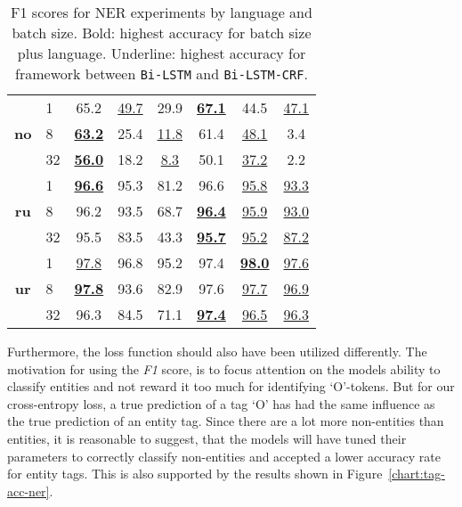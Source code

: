 \begin{table}[h!]
\begin{tabular}{c l c c c|c c c}
        \cmidrule(lr){1-8}
        \multirow{3}{*}{\bfseries no}
        &  1 &
        65.2 & \underline{49.7} & 29.9 &
        \underline{\textbf{67.1}} & 44.5 & \underline{47.1} \\
        &  8 &
        \underline{\textbf{63.2}} & 25.4 & \underline{11.8} &
        61.4 & \underline{48.1} &  3.4 \\
        & 32 &
        \underline{\textbf{56.0}} & 18.2 &  \underline{8.3 }&
        50.1 & \underline{37.2} &  2.2 \\

        \cmidrule(lr){1-8}
        \multirow{3}{*}{\bfseries ru}
        &  1 &
        \underline{\textbf{96.6}} & 95.3 & 81.2 &
        96.6 & \underline{95.8} & \underline{93.3} \\
        &  8 &
        96.2 & 93.5 & 68.7 &
        \underline{\textbf{96.4}} & \underline{95.9} & \underline{93.0} \\
        & 32 &
        95.5 & 83.5 & 43.3 &
        \underline{\textbf{95.7}} & \underline{95.2} & \underline{87.2} \\

        \cmidrule(lr){1-8}
        \multirow{3}{*}{\bfseries ur}
        &  1 &
        \underline{97.8} & 96.8 & 95.2 &
        97.4 & \underline{\textbf{98.0}} & \underline{97.6} \\
        &  8 &
        \underline{\textbf{97.8}} & 93.6 & 82.9 &
        97.6 & \underline{97.7} & \underline{96.9} \\
        & 32 &
        96.3 & 84.5 & 71.1 &
        \underline{\textbf{97.4}} & \underline{96.5} & \underline{96.3} \\
        \bottomrule
    \end{tabular}
    \caption{F1 scores for NER experiments by language and batch
        size. Bold: highest accuracy for batch size plus language. Underline:
        highest accuracy for framework between \texttt{Bi-LSTM} and
        \texttt{Bi-LSTM-CRF}.
    }\label{table:f1-total-ner}
\end{table}


Furthermore, the loss function should also have been utilized differently. The
motivation for using the \textit{F1} score, is to focus attention on the models
ability to classify entities and not reward it too much for identifying
`O'-tokens. But for our cross-entropy loss, a true prediction of a tag `O' has
had the same influence as the true prediction of an entity tag. Since there are
a lot more non-entities than entities, it is reasonable to suggest, that the
models will have tuned their parameters to correctly classify non-entities and
accepted a lower accuracy rate for entity tags. This is also supported by the
results shown in Figure~\ref{chart:tag-acc-ner}.

